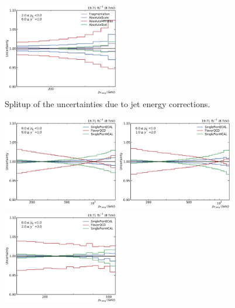 \begin{figure}[htbp]
    \includegraphics[width=0.45\textwidth]{figures/measurement/jec_relunc_0_yb2ys0.pdf}
    \caption{Splitup of the uncertainties due to jet energy corrections.}
    \label{fig:jec_relunc_0}
\end{figure}

\begin{figure}[htbp]
    \centering
    \includegraphics[width=0.45\textwidth]{figures/measurement/jec_relunc_1_yb0ys0.pdf}\hfill
    \includegraphics[width=0.45\textwidth]{figures/measurement/jec_relunc_1_yb0ys1.pdf}
    \includegraphics[width=0.45\textwidth]{figures/measurement/jec_relunc_1_yb0ys2.pdf}\hfill

\end{figure}
